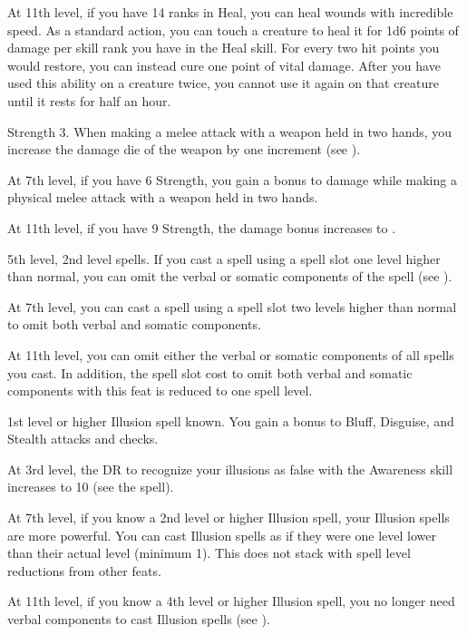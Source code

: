     At 11th level, if you have 14 ranks in Heal, you can heal wounds with incredible speed.
    As a standard action, you can touch a creature to heal it for 1d6 points of damage per skill rank you have in the Heal skill.
    For every two hit points you would restore, you can instead cure one point of vital damage.
    After you have used this ability on a creature twice, you cannot use it again on that creature until it rests for half an hour.
    \magical

    \featpre Strength 3.
    \featben When making a melee attack with a weapon held in two hands, you increase the damage die of the weapon by one increment (see ).

    At 7th level, if you have 6 Strength, you gain a  bonus to damage while making a physical melee attack with a weapon held in two hands.

    At 11th level, if you have 9 Strength, the damage bonus increases to .

    \featpre 5th level, 2nd level spells.
    \featben If you cast a spell using a spell slot one level higher than normal, you can omit the verbal or somatic components of the spell (see ).

    At 7th level, you can cast a spell using a spell slot two levels higher than normal to omit both verbal and somatic components.

    At 11th level, you can omit either the verbal or somatic components of all spells you cast.
    In addition, the spell slot cost to omit both verbal and somatic components with this feat is reduced to one spell level.

    \featpre 1st level or higher Illusion spell known.
    \featben You gain a  bonus to Bluff, Disguise, and Stealth attacks and checks.

    At 3rd level, the DR to recognize your illusions as false with the Awareness skill increases to 10 (see the  spell).

    At 7th level, if you know a 2nd level or higher Illusion spell, your Illusion spells are more powerful.
    You can cast Illusion spells as if they were one level lower than their actual level (minimum 1).
    This does not stack with spell level reductions from other feats.

    At 11th level, if you know a 4th level or higher Illusion spell, you no longer need verbal components to cast Illusion spells (see ).


